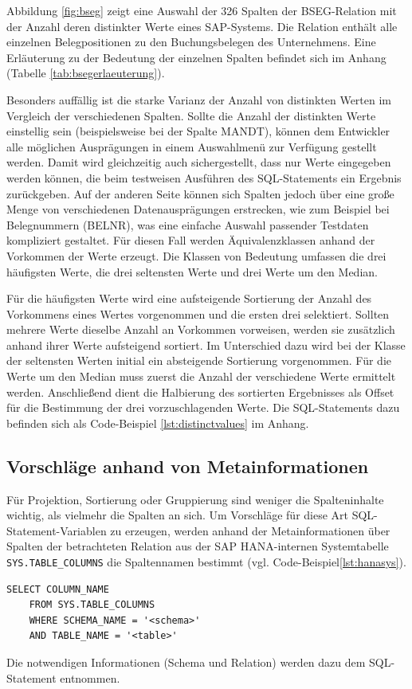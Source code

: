 Abbildung \ref{fig:bseg} zeigt eine Auswahl der 326 Spalten der BSEG-Relation mit der Anzahl deren distinkter Werte eines SAP-Systems.
Die Relation enthält alle einzelnen Belegpositionen zu den Buchungsbelegen des Unternehmens.
Eine Erläuterung zu der Bedeutung der einzelnen Spalten befindet sich im Anhang (Tabelle \ref{tab:bsegerlaeuterung}).

Besonders auffällig ist die starke Varianz der Anzahl von distinkten Werten im Vergleich der verschiedenen Spalten.
Sollte die Anzahl der distinkten Werte einstellig sein (beispielsweise bei der Spalte MANDT), können dem Entwickler alle möglichen Ausprägungen in einem Auswahlmenü zur Verfügung gestellt werden.
Damit wird gleichzeitig auch sichergestellt, dass nur Werte eingegeben werden können, die beim testweisen Ausführen des SQL-Statements ein Ergebnis zurückgeben.
Auf der anderen Seite können sich Spalten jedoch über eine große Menge von verschiedenen Datenausprägungen erstrecken, wie zum Beispiel bei Belegnummern (BELNR), was eine einfache Auswahl passender Testdaten kompliziert gestaltet.
Für diesen Fall werden Äquivalenzklassen anhand der Vorkommen der Werte erzeugt. Die Klassen von Bedeutung umfassen die drei häufigsten Werte, die drei seltensten Werte und drei Werte um den Median.

Für die häufigsten Werte wird eine aufsteigende Sortierung der Anzahl des Vorkommens eines Wertes vorgenommen und die ersten drei selektiert.
Sollten mehrere Werte dieselbe Anzahl an Vorkommen vorweisen, werden sie zusätzlich anhand ihrer Werte aufsteigend sortiert.
Im Unterschied dazu wird bei der Klasse der seltensten Werten initial ein absteigende Sortierung vorgenommen.
Für die Werte um den Median muss zuerst die Anzahl der verschiedene Werte ermittelt werden.
Anschließend dient die Halbierung des sortierten Ergebnisses als Offset für die Bestimmung der drei vorzuschlagenden Werte.
Die SQL-Statements dazu befinden sich als Code-Beispiel \ref{lst:distinctvalues} im Anhang.

\subsection{Vorschläge anhand von Metainformationen}\label{chap:databasemeta}
Für Projektion, Sortierung oder Gruppierung sind weniger die Spalteninhalte wichtig, als vielmehr die Spalten an sich.
Um Vorschläge für diese Art SQL-Statement-Variablen zu erzeugen, werden anhand der Metainformationen über Spalten der betrachteten Relation aus der SAP HANA-internen Systemtabelle \texttt{SYS.TABLE\_COLUMNS} die Spaltennamen bestimmt (vgl. Code-Beispiel\ref{lst:hanasys}).
\begin{lstlisting}[caption={SQL-Statement für Metainformationen zu Relationen}, label={lst:hanasys}, language=mySQL]
	SELECT COLUMN_NAME
	FROM SYS.TABLE_COLUMNS
	WHERE SCHEMA_NAME = '<schema>'
	AND TABLE_NAME = '<table>'
\end{lstlisting}
Die notwendigen Informationen (Schema und Relation) werden dazu dem SQL-Statement entnommen.

